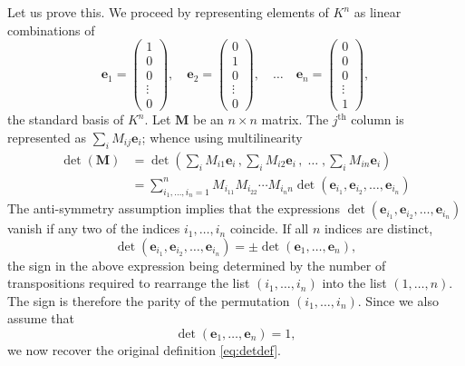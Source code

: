 \documentclass[12pt]{article}
\newcommand{\lp}{\left(}
\newcommand{\rp}{\right)}
\newcommand{\supth}{^{\text{th}}}
\newcommand{\mM}{\mathbf{M}}
\newcommand{\be}{\mathbf{e}}
\begin{document}
Let us prove this.  We  proceed by representing elements of $K^n$
as linear combinations of
$$
\be_1=\begin{pmatrix} 1\\0\\0\\\vdots\\0\end{pmatrix},\quad
\be_2=\begin{pmatrix} 0\\1\\0\\\vdots\\0\end{pmatrix},\quad \ldots\quad
\be_n=\begin{pmatrix} 0\\0\\0\\ \vdots\\1\end{pmatrix},
$$
the standard basis of $K^n$. Let $\mM$ be an $n\times n$ matrix.
The $j\supth$ column is represented as $\sum_i M_{ij}\be_i$; whence
using multilinearity
\begin{align*}
\det(\mM) &= \det\lp \sum_i M_{i1}\be_i\,,\sum_i
M_{i2}\be_i\,,\;\ldots\;,\sum_i M_{in} \be_i\rp\\  
&=\sum_{i_1,\ldots,i_n=1}^n M_{i_11} M_{i_22} \cdots M_{i_n n} 
\det(\be_{i_1},\be_{i_2},\ldots,\be_{i_n})
\end{align*}
The anti-symmetry assumption implies that the expressions
$\det(\be_{i_1},\be_{i_2},\ldots,\be_{i_n})$ vanish if any two of the
indices $i_1,\ldots,i_n$ coincide.  If all $n$ indices are distinct,
$$\det(\be_{i_1},\be_{i_2},\ldots,\be_{i_n}) = \pm
\det(\be_1,\ldots,\be_n),$$
the sign in the above expression being
determined by the  number of transpositions required to rearrange
the list $(i_1,\ldots,i_n)$ into the list $(1,\ldots,n)$. The sign is
therefore the parity of the permutation $(i_1,\ldots,i_n)$.  Since we
also assume that
$$\det(\be_1,\ldots,\be_n)=1,$$ we now recover the original definition 
\eqref{eq:detdef}.
\end{document}
